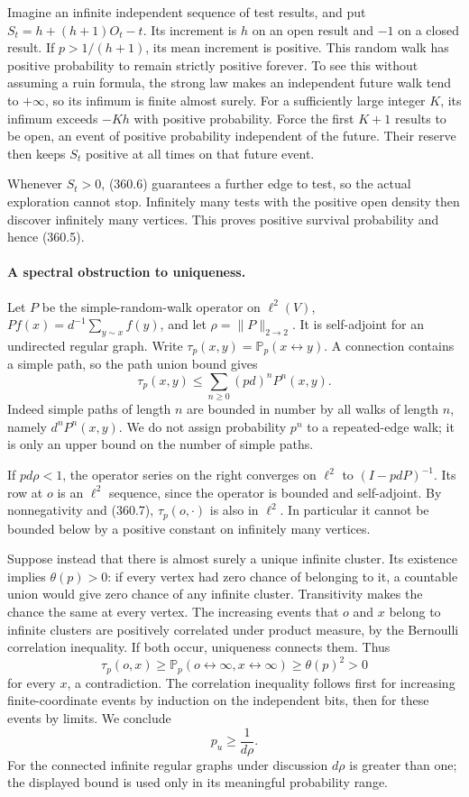\documentclass[11pt]{article}
\begin{document}
Imagine an infinite independent sequence of test results, and put
$S_t=h+(h+1)O_t-t$. Its increment is $h$ on an open result and
$-1$ on a closed result. If $p>1/(h+1)$, its mean increment is
positive. This random walk has positive probability to remain
strictly positive forever. To see this without assuming a ruin
formula, the strong law makes an independent future walk tend to
$+\infty$, so its infimum is finite almost surely. For a sufficiently
large integer $K$, its infimum exceeds $-Kh$ with positive
probability. Force the first $K+1$ results to be open, an event
of positive probability independent of the future. Their reserve
then keeps $S_t$ positive at all times on that future event.

Whenever $S_t>0$, (360.6) guarantees a further edge to test, so
the actual exploration cannot stop. Infinitely many tests with the
positive open density then discover infinitely many vertices. This
proves positive survival probability and hence (360.5).

\paragraph{A spectral obstruction to uniqueness.}
Let $P$ be the simple-random-walk operator on $\ell^2(V)$,
$Pf(x)=d^{-1}\sum_{y\sim x}f(y)$, and let $\rho=\|P\|_{2\to2}$.
It is self-adjoint for an undirected regular graph. Write
$\tau_p(x,y)=\mathbb P_p(x\leftrightarrow y)$. A connection
contains a simple path, so the path union bound gives
\[
 \tau_p(x,y)\leq\sum_{n\geq0}(pd)^nP^n(x,y).
 \tag{360.7}
\]
Indeed simple paths of length $n$ are bounded in number by all
walks of length $n$, namely $d^nP^n(x,y)$. We do not assign
probability $p^n$ to a repeated-edge walk; it is only an upper
bound on the number of simple paths.

If $pd\rho<1$, the operator series on the right converges on
$\ell^2$ to $(I-pdP)^{-1}$. Its row at $o$ is an $\ell^2$
sequence, since the operator is bounded and self-adjoint. By
nonnegativity and (360.7), $\tau_p(o,\cdot)$ is also in $\ell^2$.
In particular it cannot be bounded below by a positive constant
on infinitely many vertices.

Suppose instead that there is almost surely a unique infinite
cluster. Its existence implies $\theta(p)>0$: if every vertex
had zero chance of belonging to it, a countable union would give
zero chance of any infinite cluster. Transitivity makes the chance
the same at every vertex. The increasing events that $o$ and $x$
belong to infinite clusters are positively correlated under product
measure, by the Bernoulli correlation inequality. If both occur,
uniqueness connects them. Thus
\[
 \tau_p(o,x)\geq\mathbb P_p(o\leftrightarrow\infty,
                              x\leftrightarrow\infty)
                  \geq\theta(p)^2>0
 \tag{360.8}
\]
for every $x$, a contradiction. The correlation inequality follows
first for increasing finite-coordinate events by induction on the
independent bits, then for these events by limits. We conclude
\[
 p_u\geq\frac1{d\rho}.
 \tag{360.9}
\]
For the connected infinite regular graphs under discussion $d\rho$
is greater than one; the displayed bound is used only in its
meaningful probability range.
\end{document}
